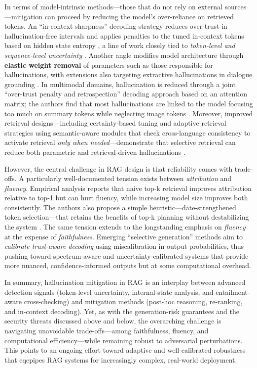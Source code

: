 \documentclass[11pt]{article}
\begin{document}
In terms of model-intrinsic methods---those that do not rely on external sources---mitigation can proceed by reducing the model's over-reliance on retrieved tokens. An ``in-context sharpness'' decoding strategy reduces over-trust in hallucination-free intervals and applies penalties to the tuned in-context tokens based on hidden state entropy \cite{ref142}, a line of work closely tied to \emph{token-level and sequence-level uncertainty} \cite{ref140,ref141}. Another angle modifies model architecture through \textbf{elastic weight removal} of parameters such as those responsible for hallucinations, with extensions also targeting extractive hallucinations in dialogue grounding \cite{ref148}. In multimodal domains, hallucination is reduced through a joint ``over-trust penalty and retrospection'' decoding approach based on an attention matrix; the authors find that most hallucinations are linked to the model focusing too much on summary tokens while neglecting image tokens \cite{ref149}. Moreover, improved retrieval designs---including certainty-based tuning and adaptive retrieval strategies using semantic-aware modules that check cross-language consistency to activate retrieval \emph{only when needed}---demonstrate that selective retrieval can reduce both parametric and retrieval-driven hallucinations \cite{ref150}.

However, the central challenge in RAG design is that reliability comes with trade-offs. A particularly well-documented tension exists between \emph{attribution} and \emph{fluency}. Empirical analysis reports that naive top-k retrieval improves attribution relative to top-1 but can hurt fluency, while increasing model size improves both consistently. The authors also propose a simple heuristic---date-strengthened token selection---that retains the benefits of top-k planning without destabilizing the system \cite{ref151}. The same tension extends to the longstanding emphasis on \emph{fluency} at the expense of \emph{faithfulness}. Emerging ``selective generation'' methods aim to \emph{calibrate trust-aware decoding} using miscalibration in output probabilities, thus pushing toward spectrum-aware and uncertainty-calibrated systems that provide more nuanced, confidence-informed outputs but at some computational overhead.

In summary, hallucination mitigation in RAG is an interplay between advanced detection signals (token-level uncertainty, internal-state analysis, and entailment-aware cross-checking) and mitigation methods (post-hoc reasoning, re-ranking, and in-context decoding). Yet, as with the generation-risk guarantees and the security threats discussed above and below, the overarching challenge is navigating unavoidable trade-offs---among faithfulness, fluency, and computational efficiency---while remaining robust to adversarial perturbations. This points to an ongoing effort toward adaptive and well-calibrated robustness that eqepipes RAG systems for increasingly complex, real-world deployment.
\end{document}
